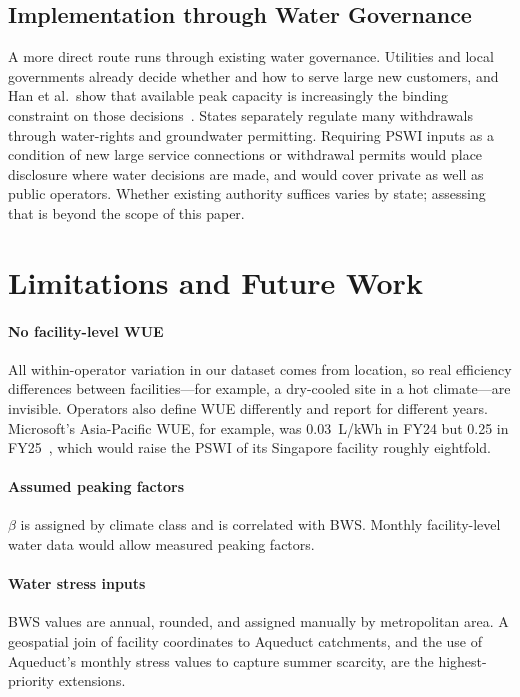 \documentclass[conference,10pt]{IEEEtran}
\begin{document}
\subsection{Implementation through Water Governance}

A more direct route runs through existing water governance. Utilities and
local governments already decide whether and how to serve large new
customers, and Han et al.\ show that available peak capacity is
increasingly the binding constraint on those decisions~\cite{han2026}.
States separately regulate many withdrawals through water-rights and
groundwater permitting. Requiring PSWI inputs as a condition of new large
service connections or withdrawal permits would place disclosure where
water decisions are made, and would cover private as well as public
operators. Whether existing authority suffices varies by state; assessing
that is beyond the scope of this paper.

\section{Limitations and Future Work}
\label{sec:limitations}

\paragraph{No facility-level WUE}
All within-operator variation in our dataset comes from location, so real
efficiency differences between facilities---for example, a dry-cooled site
in a hot climate---are invisible. Operators also define WUE differently
and report for different years. Microsoft's Asia-Pacific WUE, for example,
was 0.03~L/kWh in FY24 but 0.25 in FY25~\cite{microsoft2025efficiency},
which would raise the PSWI of its Singapore facility roughly eightfold.

\paragraph{Assumed peaking factors}
$\beta$ is assigned by climate class and is correlated with BWS. Monthly
facility-level water data would allow measured peaking factors.

\paragraph{Water stress inputs}
BWS values are annual, rounded, and assigned manually by metropolitan area.
A geospatial join of facility coordinates to Aqueduct catchments, and the
use of Aqueduct's monthly stress values to capture summer scarcity, are
the highest-priority extensions.
\end{document}
